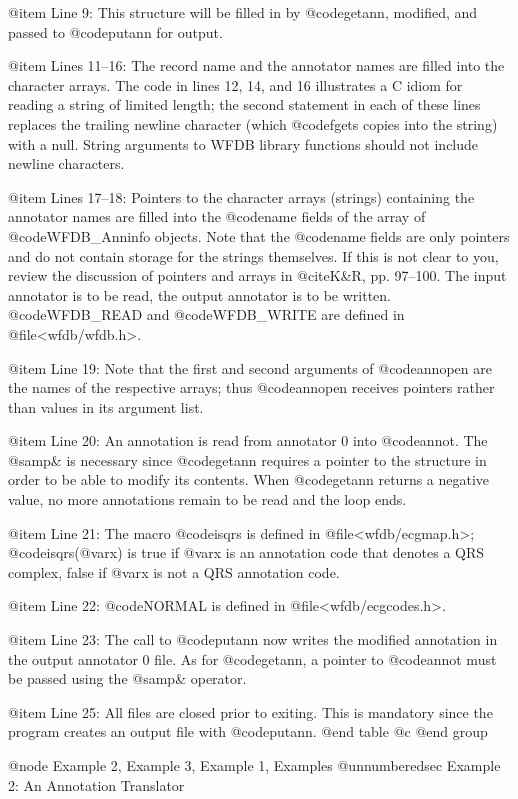 {{{{{{{{{@item Line 9:
This structure will be filled in by @code{getann}, modified, and passed
to @code{putann} for output.

@item Lines 11--16:
The record name and the annotator names are filled into the character
arrays.  The code in lines 12, 14, and 16 illustrates a C idiom for
reading a string of limited length; the second statement in each of
these lines replaces the trailing newline character (which @code{fgets}
copies into the string) with a null.  String arguments to WFDB library
functions should not include newline characters.

@item Lines 17--18:
Pointers to the character arrays (strings) containing the annotator
names are filled into the @code{name} fields of the array of
@code{WFDB_Anninfo} objects. Note that the @code{name} fields are only
pointers and do not contain storage for the strings themselves.  If this
is not clear to you, review the discussion of pointers and arrays in
@cite{K&R}, pp.  97--100.  The input annotator is to be read, the output
annotator is to be written.  @code{WFDB_READ} and @code{WFDB_WRITE} are
defined in @file{<wfdb/wfdb.h>}.

@item Line 19:
Note that the first and second arguments of @code{annopen} are
the names of the respective arrays; thus @code{annopen} receives pointers
rather than values in its argument list.

@item Line 20:
An annotation is read from annotator 0 into @code{annot}.
The @samp{&} is necessary since @code{getann} requires a pointer to
the structure in order to be able to modify its contents.  When
@code{getann} returns a negative value, no more annotations remain to be
read and the loop ends.

@item Line 21:
The macro @code{isqrs} is defined in @file{<wfdb/ecgmap.h>};
@code{isqrs(@var{x})} is true if @var{x} is an annotation code that
denotes a QRS complex, false if @var{x} is not a QRS annotation
code.

@item Line 22:
@code{NORMAL} is defined in @file{<wfdb/ecgcodes.h>}.

@item Line 23:
The call to @code{putann} now writes the modified annotation in the
output annotator 0 file.  As for @code{getann}, a pointer to
@code{annot} must be passed using the @samp{&} operator.

@item Line 25:
All files are closed prior to exiting.  This is mandatory since the
program creates an output file with @code{putann}.
@end table
@c @end group

@node     Example 2, Example 3, Example 1, Examples
@unnumberedsec Example 2: An Annotation Translator

}}}}}}}}}

